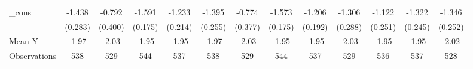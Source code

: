 {\begin{tabular}{l*{12}{c}}
\addlinespace
\_cons      &      -1.438\sym{***}&      -0.792\sym{*}  &      -1.591\sym{***}&      -1.233\sym{***}&      -1.395\sym{***}&      -0.774\sym{**} &      -1.573\sym{***}&      -1.206\sym{***}&      -1.306\sym{***}&      -1.122\sym{***}&      -1.322\sym{***}&      -1.346\sym{***}\\
            &     (0.283)         &     (0.400)         &     (0.175)         &     (0.214)         &     (0.255)         &     (0.377)         &     (0.175)         &     (0.192)         &     (0.288)         &     (0.251)         &     (0.245)         &     (0.252)         \\
\midrule
Mean Y      &       -1.97         &       -2.03         &       -1.95         &       -1.95         &       -1.97         &       -2.03         &       -1.95         &       -1.95         &       -2.03         &       -1.95         &       -1.95         &       -2.02         \\
Observations&         538         &         529         &         544         &         537         &         538         &         529         &         544         &         537         &         529         &         536         &         537         &         528         \\
\bottomrule
\end{tabular}
}
